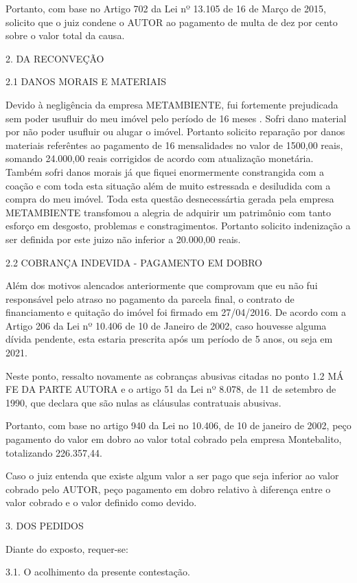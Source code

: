 \documentclass[11pt]{letter}
\begin{document}
Portanto, com base no Artigo 702 da Lei nº 13.105 de 16 de Março de 2015, solicito que o juiz condene o AUTOR ao pagamento de multa de dez por cento sobre o valor total da causa.

2. DA RECONVEÇÃO

2.1 DANOS MORAIS E MATERIAIS 
 
Devido à negligência da empresa METAMBIENTE, fui fortemente prejudicada sem poder usufluir do meu imóvel pelo período de 16 meses . Sofri dano material por não poder usufluir ou alugar o imóvel. Portanto solicito reparação por danos materiais referêntes ao pagamento de 16 mensalidades no valor de 1500,00 reais, somando 24.000,00 reais corrigidos de acordo com atualização monetária. Também sofri danos morais já que fiquei enormermente constrangida com a coação e com toda esta situação além de muito estressada e desiludida com a compra do meu imóvel. Toda esta questão desnecessártia gerada pela empresa METAMBIENTE transfomou a alegria de adquirir um patrimônio com tanto esforço em desgosto, problemas e constragimentos. Portanto solicito indenização a ser definida por este juizo não inferior a 20.000,00 reais. 

2.2 COBRANÇA INDEVIDA - PAGAMENTO EM DOBRO

Além dos motivos alencados anteriormente que comprovam que eu não fui responsável pelo atraso no pagamento da parcela final, o contrato de financiamento e quitação do imóvel foi firmado em 27/04/2016. De acordo com a Artigo 206 da Lei nº 10.406 de 10 de Janeiro de 2002, caso houvesse alguma dívida pendente, esta estaria prescrita após um período de 5 anos, ou seja em 2021.

Neste ponto, ressalto novamente as cobranças abusivas citadas no ponto 1.2 MÁ FE DA PARTE AUTORA e o artigo 51 da Lei nº 8.078, de 11 de setembro de 1990, que declara que são nulas as cláusulas contratuais abusivas. 

Portanto, com base no artigo 940 da Lei no 10.406, de 10 de janeiro de 2002, peço pagamento do valor em dobro ao valor total cobrado pela empresa Montebalito, totalizando 226.357,44.

Caso o juiz entenda que existe algum valor a ser pago que seja inferior ao valor cobrado pelo AUTOR, peço pagamento em dobro relativo à diferença entre o valor cobrado e o valor definido como devido. 

3. DOS PEDIDOS

Diante do exposto, requer-se:

3.1. O acolhimento da presente contestação.
\end{document}
